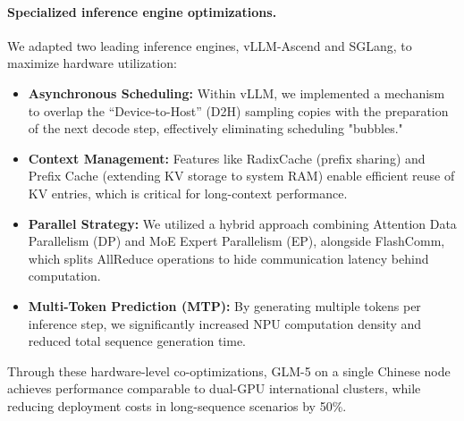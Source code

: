 \paragraph{Specialized inference engine optimizations.}
We adapted two leading inference engines, vLLM-Ascend and SGLang, to maximize hardware utilization:

\begin{itemize}[leftmargin=1.5em,itemsep=2pt]
    \item \textbf{Asynchronous Scheduling:} Within vLLM, we implemented a mechanism to overlap the ``Device-to-Host'' (D2H) sampling copies with the preparation of the next decode step, effectively eliminating scheduling "bubbles."
    
    \item \textbf{Context Management:} Features like RadixCache (prefix sharing) and Prefix Cache (extending KV storage to system RAM) enable efficient reuse of KV entries, which is critical for long-context performance.

    \item \textbf{Parallel Strategy:} We utilized a hybrid approach combining Attention Data Parallelism (DP) and MoE Expert Parallelism (EP), alongside FlashComm, which splits AllReduce operations to hide communication latency behind computation.

    \item \textbf{Multi-Token Prediction (MTP):} By generating multiple tokens per inference step, we significantly increased NPU computation density and reduced total sequence generation time.
\end{itemize}

Through these hardware-level co-optimizations, GLM-5 on a single Chinese node achieves performance comparable to dual-GPU international clusters, while reducing deployment costs in long-sequence scenarios by 50\%.